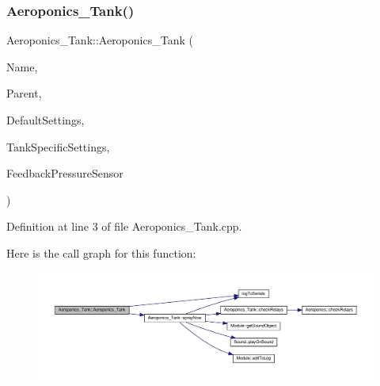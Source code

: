 \subsubsection{\texorpdfstring{Aeroponics\+\_\+\+Tank()}{Aeroponics\_Tank()}\hspace{0.1cm}{\footnotesize\ttfamily [1/2]}}
{\footnotesize\ttfamily Aeroponics\+\_\+\+Tank\+::\+Aeroponics\+\_\+\+Tank (\begin{DoxyParamCaption}\item[{const \+\_\+\+\_\+\+Flash\+String\+Helper $\ast$}]{Name,  }\item[{\hyperlink{class_module}{Module} $\ast$}]{Parent,  }\item[{\hyperlink{struct_settings_1_1_aeroponics_settings}{Settings\+::\+Aeroponics\+Settings} $\ast$}]{Default\+Settings,  }\item[{\hyperlink{struct_settings_1_1_aeroponics_settings___tank_specific}{Settings\+::\+Aeroponics\+Settings\+\_\+\+Tank\+Specific} $\ast$}]{Tank\+Specific\+Settings,  }\item[{\hyperlink{class_pressure_sensor}{Pressure\+Sensor} $\ast$}]{Feedback\+Pressure\+Sensor }\end{DoxyParamCaption})}



Definition at line 3 of file Aeroponics\+\_\+\+Tank.\+cpp.

Here is the call graph for this function\+:
\nopagebreak
\begin{figure}[H]
\begin{center}
\leavevmode
\includegraphics[width=350pt]{class_aeroponics___tank_aab07821dc597c986608a886093e14ff7_cgraph}
\end{center}
\end{figure}
\mbox{\label{class_aeroponics___tank_aab07821dc597c986608a886093e14ff7}} 
